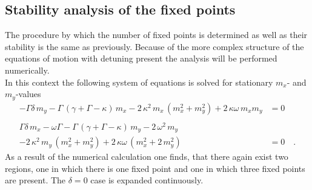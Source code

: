 \subsection{Stability analysis of the fixed points}\label{sec:stab_3D}
The procedure by which the number of fixed points is determined as well as their stability is the same as previously. Because of the more complex structure of the equations of motion with detuning present the analysis will be performed numerically.\\
In this context the following system of equations is solved for stationary $m_x$- and $m_y$-values
\begin{align*}
    -\Gamma\delta\,m_y-\Gamma\,(\gamma+\Gamma-\kappa)\,m_x-2\,\kappa^2\,m_x\,( m_x^2+ m_y^2)+2\,\kappa\omega\,m_xm_y  &=0\\\\
    \Gamma\delta\,m_x-\omega\Gamma-\Gamma\,(\gamma+\Gamma-\kappa)\,m_y-2\,\omega^2\,m_y&\\
    -2\,\kappa^2\,m_y\,( m_x^2+ m_y^2)+2\,\kappa\omega\,(m_x^2+2\,m_y^2)  &=0\quad.
\end{align*}
As a result of the numerical calculation one finds, that there again exist two regions, one in which there is one fixed point and one in which three fixed points are present. The $\delta=0$ case is expanded continuously.
